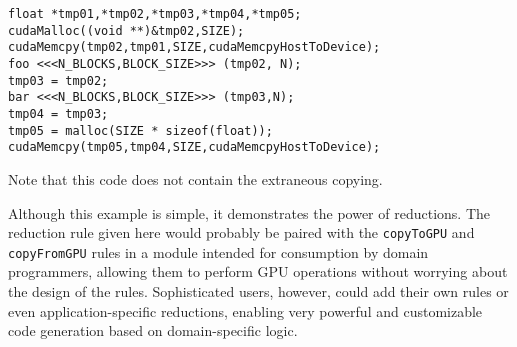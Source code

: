 \begin{verbatim}
float *tmp01,*tmp02,*tmp03,*tmp04,*tmp05;
cudaMalloc((void **)&tmp02,SIZE);
cudaMemcpy(tmp02,tmp01,SIZE,cudaMemcpyHostToDevice);
foo <<<N_BLOCKS,BLOCK_SIZE>>> (tmp02, N);
tmp03 = tmp02;
bar <<<N_BLOCKS,BLOCK_SIZE>>> (tmp03,N);
tmp04 = tmp03;
tmp05 = malloc(SIZE * sizeof(float));
cudaMemcpy(tmp05,tmp04,SIZE,cudaMemcpyHostToDevice);
\end{verbatim}

Note that this code does not contain the extraneous copying.

Although this example is simple, it demonstrates the power of reductions. The reduction rule given here would probably be paired with the \texttt{copyToGPU} and \texttt{copyFromGPU} rules in a module intended for consumption by domain programmers, allowing them to perform GPU operations without worrying about the design of the rules. Sophisticated users, however, could add their own rules or even application-specific reductions, enabling very powerful and customizable code generation based on domain-specific logic.
